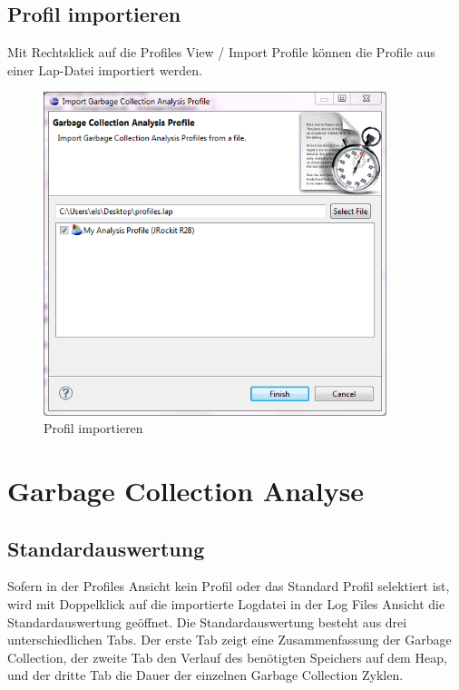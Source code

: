 \subsection{Profil importieren}

Mit Rechtsklick auf die Profiles View / Import Profile können die Profile aus einer Lap-Datei importiert werden.
 \begin{figure}[H]
  	\centering
    	\includegraphics[width=10cm]{images/tutorial_importprofile}
        	\caption{Profil importieren}
\end{figure}

\section{Garbage Collection Analyse}
\subsection{Standardauswertung}
Sofern in der Profiles Ansicht kein Profil oder das Standard Profil selektiert ist, wird mit Doppelklick auf die importierte Logdatei in der Log Files Ansicht die Standardauswertung geöffnet. Die Standardauswertung besteht aus drei unterschiedlichen Tabs. Der erste Tab zeigt eine Zusammenfassung der Garbage Collection, der zweite Tab den Verlauf des benötigten Speichers auf dem Heap, und der dritte Tab die Dauer der einzelnen Garbage Collection Zyklen. 

